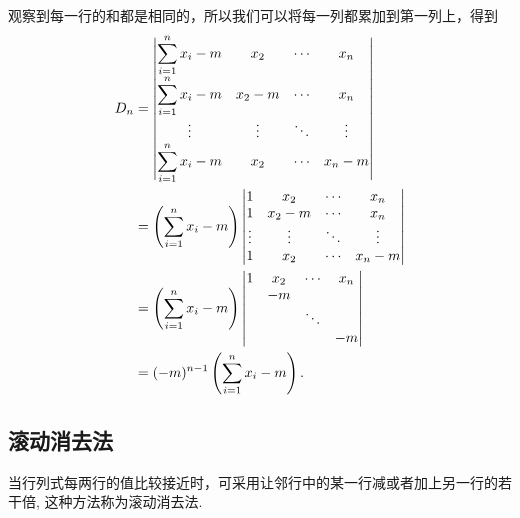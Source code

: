 \begin{solution}
    观察到每一行的和都是相同的，所以我们可以将每一列都累加到第一列上，得到
    \begin{align*}
        D_n & =\begin{vmatrix}
                   \displaystyle\sum_{i=1}^{n}\limits x_i-m & x_2    & \cdots & x_n    \\
                   \displaystyle\sum_{i=1}^{n}\limits x_i-m & x_2-m  & \cdots & x_n    \\
                   \vdots                            & \vdots & \ddots & \vdots \\
                   \displaystyle\sum_{i=1}^{n}\limits x_i-m & x_2    & \cdots & x_n-m
               \end{vmatrix} \\
            & =\left(\sum_{i=1}^{n}\limits x_i-m\right)
        \begin{vmatrix}
            1      & x_2    & \cdots & x_n    \\
            1      & x_2-m  & \cdots & x_n    \\
            \vdots & \vdots & \ddots & \vdots \\
            1      & x_2    & \cdots & x_n-m
        \end{vmatrix}                                   \\
            & =\left(\sum_{i=1}^{n}\limits x_i-m\right)
        \begin{vmatrix}
            1 & x_2 & \cdots & x_n \\
              & -m  &        &     \\
              &     & \ddots &     \\
              &     &        & -m
        \end{vmatrix}                                              \\
            & =(-m)^{n-1}\left(\sum_{i=1}^{n}\limits x_i-m\right).
    \end{align*}
\end{solution}

\subsection{滚动消去法}

当行列式每两行的值比较接近时，可采用让邻行中的某一行减或者加上另一行的若干倍, 这种方法称为滚动消去法.

